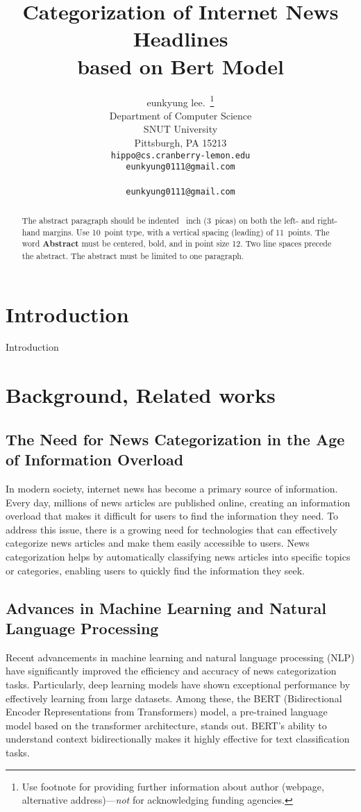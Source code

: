 \documentclass{article}
\title{Categorization of Internet News Headlines \\ based on Bert Model}
\author{%
  eunkyung lee.~\thanks{Use footnote for providing further information
    about author (webpage, alternative address)---\emph{not} for acknowledging
    funding agencies.} \\
  Department of Computer Science\\
  SNUT University\\
  Pittsburgh, PA 15213 \\
  \texttt{hippo@cs.cranberry-lemon.edu} \\
  \And
  \texttt{eunkyung0111@gmail.com} \\
   \aAddress{seoul, korea} \\
  \texttt{eunkyung0111@gmail.com} \\
}
\begin{document}
\maketitle

\begin{abstract}
  The abstract paragraph should be indented ~inch (3~picas) on
  both the left- and right-hand margins. Use 10~point type, with a vertical
  spacing (leading) of 11~points.  The word \textbf{Abstract} must be centered,
  bold, and in point size 12. Two line spaces precede the abstract. The abstract
  must be limited to one paragraph.
\end{abstract}

\section{Introduction}

Introduction

\section{Background, Related works}
\label{gen_inst}

\subsection{The Need for News Categorization in the Age of Information Overload}
In modern society, internet news has become a primary source of information. Every day, millions of news articles are published online, creating an information overload that makes it difficult for users to find the information they need. To address this issue, there is a growing need for technologies that can effectively categorize news articles and make them easily accessible to users. News categorization helps by automatically classifying news articles into specific topics or categories, enabling users to quickly find the information they seek.

\subsection{Advances in Machine Learning and Natural Language Processing}
Recent advancements in machine learning and natural language processing (NLP) have significantly improved the efficiency and accuracy of news categorization tasks. Particularly, deep learning models have shown exceptional performance by effectively learning from large datasets. Among these, the BERT (Bidirectional Encoder Representations from Transformers) model, a pre-trained language model based on the transformer architecture, stands out. BERT's ability to understand context bidirectionally makes it highly effective for text classification tasks.
\end{document}
